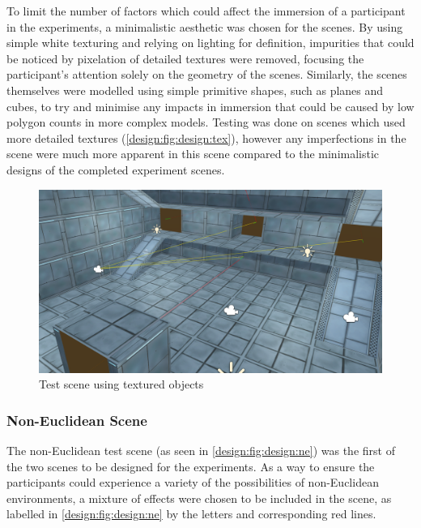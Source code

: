 		To limit the number of factors which could affect the immersion of a participant in the experiments, a minimalistic aesthetic was chosen for the scenes.
		By using simple white texturing and relying on lighting for definition, impurities that could be noticed by pixelation of detailed textures were removed, focusing the participant's attention solely on the geometry of the scenes.
		Similarly, the scenes themselves were modelled using simple primitive shapes, such as planes and cubes, to try and minimise any impacts in immersion that could be caused by low polygon counts in more complex models.
		Testing was done on scenes which used more detailed textures (\autoref{design:fig:design:tex}), however any imperfections in the scene were much more apparent in this scene compared to the minimalistic designs of the completed experiment scenes.

		\begin{figure}[h]
			\includegraphics[width=1\textwidth]{Images/Lines_Everywhere}
			\centering
			\caption{Test scene using textured objects}
			\label{design:fig:design:tex}
		\end{figure}

		\subsubsection{Non-Euclidean Scene}

			The non-Euclidean test scene (as seen in \autoref{design:fig:design:ne}) was the first of the two scenes to be designed for the experiments.
			As a way to ensure the participants could experience a variety of the possibilities of non-Euclidean environments, a mixture of effects were chosen to be included in the scene, as labelled in \autoref{design:fig:design:ne} by the letters and corresponding red lines.

